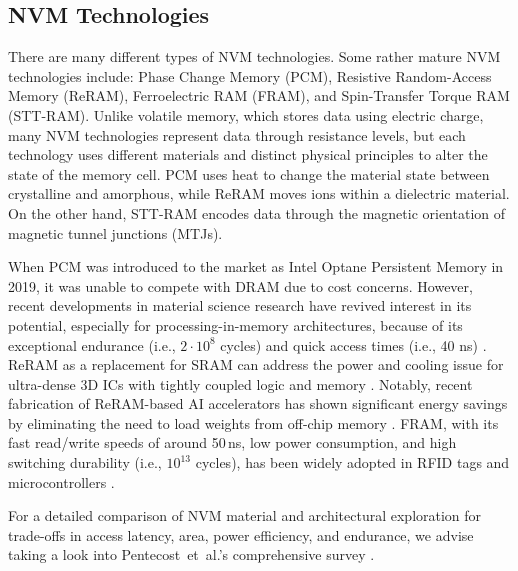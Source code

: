 \documentclass[manuscript,screen]{acmart}
\begin{document}
\subsection{NVM Technologies}
\label{subsec:materials}
There are many different types of NVM technologies.
Some rather mature NVM technologies include: Phase Change Memory (PCM), Resistive Random-Access Memory (ReRAM), Ferroelectric RAM (FRAM), and Spin-Transfer Torque RAM (STT-RAM).
Unlike volatile memory, which stores data using electric charge, many NVM technologies represent data through resistance levels, but each technology uses different materials and distinct physical principles to alter the state of the memory cell. 
PCM uses heat to change the material state between crystalline and amorphous, while ReRAM moves ions within a dielectric material. On the other hand, STT-RAM encodes data through the magnetic orientation of magnetic tunnel junctions (MTJs).


When PCM was introduced to the market as Intel Optane Persistent Memory in 2019, it was unable to compete with DRAM due to cost concerns. However, recent developments in material science research have revived interest in its potential, especially for processing-in-memory architectures, because of its exceptional endurance (i.e., $2 \cdot 10^8$ cycles) and quick access times (i.e., 40 ns) \cite{pcm:2024}.
ReRAM as a replacement for SRAM can address the power and cooling issue for ultra-dense 3D ICs with tightly coupled logic and memory \cite{rram:23}. Notably, recent fabrication of ReRAM-based AI accelerators has shown significant energy savings by eliminating the need to load weights from off-chip memory \cite{rram:22}.
FRAM, with its fast read/write speeds of around 50\,ns, low power consumption, and high switching durability (i.e., $10^{13}$ cycles), has been widely adopted in RFID tags and microcontrollers \cite{fram:24}.

For a detailed comparison of NVM material and architectural exploration for trade-offs in access latency, area, power efficiency, and endurance, we advise taking a look into Pentecost~et~al.'s comprehensive survey \cite{9773239}.
\end{document}
